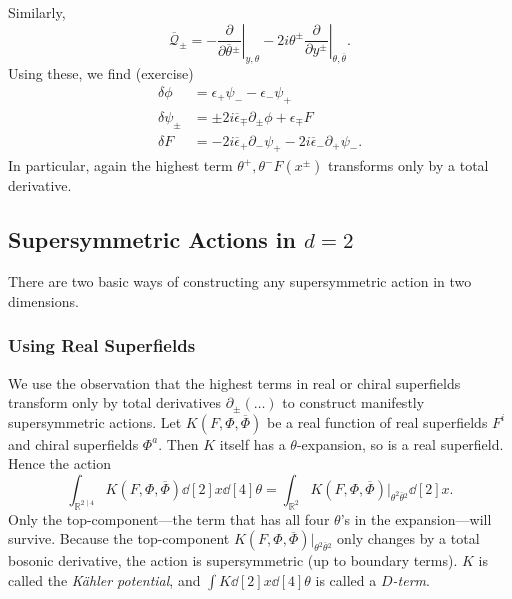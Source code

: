 Similarly, 
\begin{equation}
  \overline{\mathcal{Q}}{}_{\pm} = - \left.\frac{\partial }{\partial \overline{\theta}{}^{\pm}} \right\rvert_{y, \theta} - 2 i \theta^{\pm} \left. \frac{\partial }{\partial y^{\pm}} \right\rvert_{\theta, \overline{\theta}{}}.
\end{equation}
Using these, we find (exercise)
\begin{align}
  \delta \phi &= \epsilon_+ \psi_- - \epsilon_- \psi_+ \\
  \delta \psi_{\pm} &= \pm 2 i \overline{\epsilon}{}_{\mp} \partial_{\pm} \phi + \epsilon_{\mp} F \\
  \delta F &= -2 i \overline{\epsilon}{}_{+} \partial_- \psi_+ - 2 i \overline{\epsilon}{}_- \partial_+ \psi_-.
\end{align}
In particular, again the highest term $\theta^+, \theta^- F(x^{\pm})$ transforms only by a total derivative.

\subsection{Supersymmetric Actions in \texorpdfstring{$d = 2$}{Two Dimensions}}%
\label{sub:supersymmetric_actions}

There are two basic ways of constructing any supersymmetric action in two dimensions.

\subsubsection*{Using Real Superfields}%

We use the observation that the highest terms in real or chiral superfields transform only by total derivatives $\partial_{\pm} ( \dots )$ to construct manifestly supersymmetric actions.
Let $K(F, \Phi, \overline{\Phi}{})$ be a real function of real superfields $F^i$ and chiral superfields $\Phi^a$.
Then $K$ itself has a $\theta$-expansion, so is a real superfield.
Hence the action
\begin{equation}
  \int_{\mathbb{R}^{2 \mid 4}} K(F, \Phi, \overline{\Phi}{}) \dd[2]{x} \dd[4]{\theta} = \int_{\mathbb{R}^2} K(F, \Phi, \overline{\Phi}{}) \rvert_{\theta^2 \overline{\theta}{}^2} \dd[2]{x}.
\end{equation}
Only the top-component---the term that has all four $\theta$'s in the expansion---will survive.
Because the top-component $K(F, \Phi, \overline{\Phi}{})\rvert_{\theta^2 \overline{\theta}{}^2}$ only changes by a total bosonic derivative, the action is supersymmetric (up to boundary terms).
$K$ is called the \emph{Kähler potential}, and $\int K \dd[2]{x} \dd[4]{\theta}$ is called a \emph{$D$-term}.

